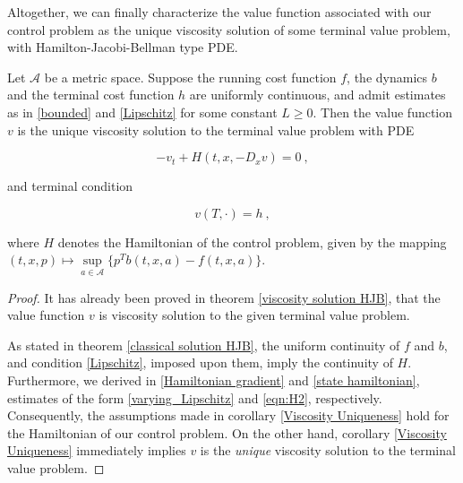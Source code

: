 	  Altogether, we can finally characterize the value function associated with our control problem as the unique viscosity solution of some terminal value problem, with Hamilton-Jacobi-Bellman type PDE.
	  
	  \begin{theorem}
	  	\label{value characterization}
	  	Let $ \mathcal{A} $ be a metric space. Suppose the running cost function $ f $, the dynamics $ b $ and the terminal cost function $ h $ are uniformly continuous, and admit estimates as in \eqref{bounded} and \eqref{Lipschitz} for some constant $ L \geq 0 $. Then the value function $ v $ is the unique viscosity solution to the terminal value problem with PDE
	  	
	  	\begin{equation*}
	  	-v_t + H(t, x, -D_x v) = 0 \ ,
	  	\end{equation*}
	  	
	  	and terminal condition
	  	
	  	\begin{equation*}
	  	v(T, \cdot) = h \ ,
	  	\end{equation*}
	  	
	  	where $ H $ denotes the Hamiltonian of the control problem, given by the mapping $ (t, x, p) \mapsto \sup\limits_{a \in \mathcal{A}} \bigg\{ p^{T} b(t, x, a) - f(t, x, a) \bigg\} $.
	  	
	  	\begin{proof}
	  		It has already been proved in theorem \ref{viscosity solution HJB}, that the value function $ v $ is viscosity solution to the given terminal value problem. 
	  		
	  		As stated in theorem \ref{classical solution HJB}, the uniform continuity of $ f $ and $ b $, and condition \eqref{Lipschitz}, imposed upon them, imply the continuity of $ H $. Furthermore, we derived in \ref{Hamiltonian gradient} and \ref{state hamiltonian}, estimates of the form \eqref{varying_Lipschitz} and \eqref{eqn:H2}, respectively. Consequently, the assumptions made in corollary \ref{Viscosity Uniqueness} hold for the Hamiltonian of our control problem. On the other hand, corollary \ref{Viscosity Uniqueness} immediately implies $ v $ is the \emph{unique} viscosity solution to the terminal value problem.
	  	\end{proof}
	  \end{theorem}
		  